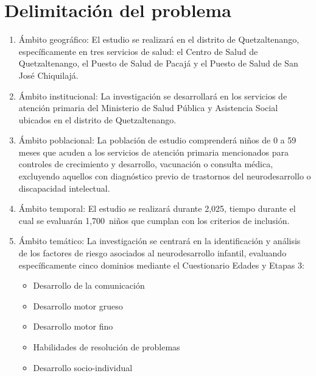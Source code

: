 \documentclass[11pt,letterpaper]{report}
\newcommand{\tiempito}{durante 2,025}
\newcommand{\muestradeseada}{1,700}
\begin{document}
\section{Delimitación del problema}
\begin{enumerate}
	\item Ámbito geográfico: El estudio se realizará en el distrito de
		Quetzaltenango, específicamente en tres servicios de salud: el Centro
		de Salud de Quetzaltenango, el Puesto de Salud de Pacajá y el Puesto de
		Salud de San José Chiquilajá.
	\item Ámbito institucional: La investigación se desarrollará en los
		servicios de atención primaria del Ministerio de Salud Pública y
		Asistencia Social ubicados en el distrito de Quetzaltenango.
	\item Ámbito poblacional: La población de estudio comprenderá niños de 0 a
		59 meses que acuden a los servicios de atención primaria mencionados
		para controles de crecimiento y desarrollo, vacunación o consulta
		médica, excluyendo aquellos con diagnóstico previo de trastornos del
		neurodesarrollo o discapacidad intelectual.
	\item Ámbito temporal: El estudio se realizará \tiempito, tiempo durante el
		cual se evaluarán \muestradeseada\ niños que cumplan con los criterios
		de inclusión.
	\item Ámbito temático: La investigación se centrará en la identificación y
		análisis de los factores de riesgo asociados al neurodesarrollo
		infantil, evaluando específicamente cinco dominios mediante el
		Cuestionario Edades y Etapas 3:
		\begin{itemize}
			\item Desarrollo de la comunicación
			\item Desarrollo motor grueso
			\item Desarrollo motor fino
			\item Habilidades de resolución de problemas
			\item Desarrollo socio-individual
		\end{itemize}
\end{enumerate}
\end{document}
